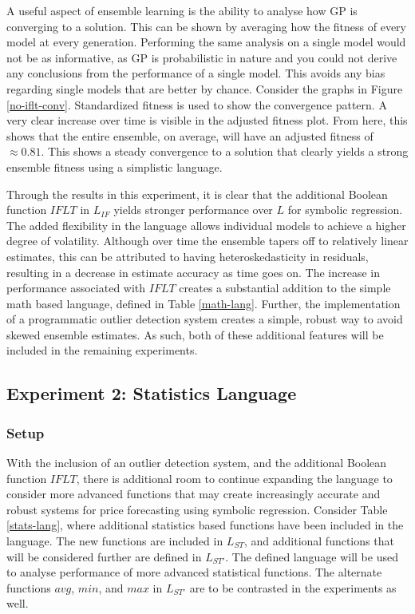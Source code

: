 \documentclass[12pt, letterpaper]{article}
\begin{document}
\textrm{ \indent A useful aspect of ensemble learning is the ability to analyse how GP is converging to a solution. This can be shown by averaging how the fitness of every model at every generation. Performing the same analysis on a single model would not be as informative, as GP is probabilistic in nature and you could not derive any conclusions from the performance of a single model. This avoids any bias regarding single models that are better by chance. Consider the graphs in Figure \ref{no-iflt-conv}. Standardized fitness is used to show the convergence pattern. A very clear increase over time is visible in the adjusted fitness plot. From here, this shows that the entire ensemble, on average, will have an adjusted fitness of $\approx 0.81$. This shows a steady convergence to a solution that clearly yields a strong ensemble fitness using a simplistic language. }

\textrm{ \indent Through the results in this experiment, it is clear that the additional Boolean function $IFLT$ in $L_{IF}$ yields stronger performance over $L$ for symbolic regression. The added flexibility in the language allows individual models to achieve a higher degree of volatility. Although over time the ensemble tapers off to relatively linear estimates, this can be attributed to having heteroskedasticity in residuals, resulting in a decrease in estimate accuracy as time goes on. The increase in performance associated with $IFLT$ creates a substantial addition to the simple math based language, defined in Table \ref{math-lang}. Further, the implementation of a programmatic outlier detection system creates a simple, robust way to avoid skewed ensemble estimates. As such, both of these additional features will be included in the remaining experiments. }

\subsection{Experiment 2: Statistics Language}

\subsubsection{Setup}

\textrm{ \indent With the inclusion of an outlier detection system, and the additional Boolean function $IFLT$, there is additional room to continue expanding the language to consider more advanced functions that may create increasingly accurate and robust systems for price forecasting using symbolic regression. Consider Table \ref{stats-lang}, where additional statistics based functions have been included in the language. The new functions are included in $L_{ST}$, and additional functions that will be considered further are defined in $L_{ST'}$. The defined language will be used to analyse performance of more advanced statistical functions. The alternate functions $avg$, $min$, and $max$ in $L_{ST'}$ are to be contrasted in the experiments as well.}
\end{document}
